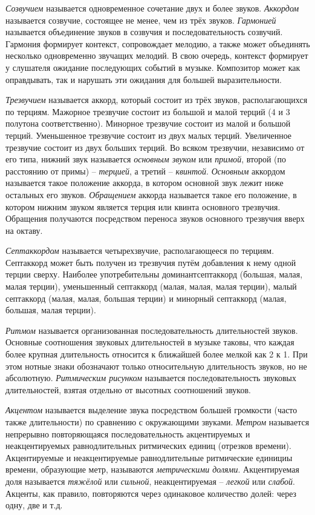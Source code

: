 \emph{Созвучием} называется одновременное сочетание двух и более звуков.
\emph{Аккордом} называется созвучие, состоящее не менее, чем из трёх звуков.
\emph{Гармонией} называется объединение звуков в созвучия и последовательность
созвучий. Гармония формирует контекст, сопровождает мелодию, а также может
объединять несколько одновременно звучащих мелодий. В свою очередь, контекст
формирует у слушателя ожидание последующих событий в музыке. Композитор может
как оправдывать, так и нарушать эти ожидания для большей выразительности.

\emph{Трезвучием} называется аккорд, который состоит из трёх звуков,
располагающихся по терциям. Мажорное трезвучие состоит из большой и малой терций
(4 и 3 полутона соответственно). Минорное трезвучие состоит из малой и большой
терций. Уменьшенное трезвучие состоит из двух малых терций. Увеличенное
трезвучие состоит из двух больших терций. Во всяком трезвучии, независимо от его
типа, нижний звук называется \emph{основным звуком} или \emph{примой}, второй
(по расстоянию от примы) -- \emph{терцией}, а третий -- \emph{квинтой}.
\emph{Основным} аккордом называется такое положение аккорда, в котором основной
звук лежит ниже остальных его звуков. \emph{Обращением} аккорда называется такое
его положение, в котором нижним звуком является терция или квинта основного
трезвучия. Обращения получаются посредством переноса звуков основного трезвучия
вверх на октаву.

\emph{Септаккордом} называется четырехзвучие, располагающееся по терциям.
Септаккорд может быть получен из трезвучия путём добавления к нему одной терции
сверху. Наиболее употребительны доминантсептаккорд (большая, малая, малая
терции), уменьшенный септаккорд (малая, малая, малая терции), малый септаккорд
(малая, малая, большая терции) и минорный септаккорд (малая, большая, малая
терции).

\emph{Ритмом} называется организованная последовательность длительностей звуков.
Основные соотношения звуковых длительностей в музыке таковы, что каждая более
крупная длительность относится к ближайшей более мелкой как 2 к 1. При этом
нотные знаки обозначают только относительную длительность звуков, но не
абсолютную. \emph{Ритмическим рисунком} называется последовательность звуковых
длительностей, взятая отдельно от высотных соотношений звуков.

\emph{Акцентом} называется выделение звука посредством большей громкости (часто
также длительности) по сравнению с окружающими звуками. \emph{Метром} называется
непрерывно повторяющаяся последовательность акцентируемых и неакцентируемых
равнодлительных ритмических единиц (отрезков времени). Акцентируемые и
неакцентируемые равнодлительные ритмические единициы времени, образующие метр,
называются \emph{метрическими долями}. Акцентируемая доля называется
\emph{тяжёлой} или \emph{сильной}, неакцентируемая -- \emph{легкой} или
\emph{слабой}. Акценты, как правило, повторяются через одинаковое количество
долей: через одну, две и т.д.

